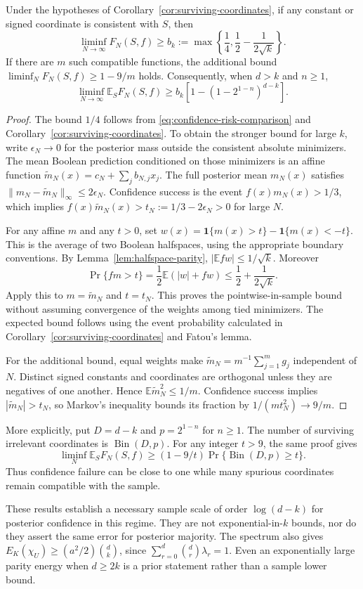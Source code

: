 \begin{corollary}
\label{cor:confidence-groundstates}
Under the hypotheses of Corollary~\ref{cor:surviving-coordinates},
if any constant or signed coordinate is consistent with $S$, then
\[
 \liminf_{N\to\infty}F_N(S,f)
 \ge b_k:=\max\left\{\frac14,\frac12-\frac1{2\sqrt{k}}\right\}.
\]
If there are $m$ such compatible functions, the additional bound
$\liminf_N F_N(S,f)\ge1-9/m$ holds.
Consequently, when $d>k$ and $n\ge1$,
\[
 \liminf_{N\to\infty}\mathbb E_S F_N(S,f)
 \ge b_k\left[1-\left(1-2^{1-n}\right)^{d-k}\right].
\]
\end{corollary}

\begin{proof}
The bound $1/4$ follows from
\eqref{eq:confidence-risk-comparison} and
Corollary~\ref{cor:surviving-coordinates}. To obtain the stronger
bound for large $k$, write $\epsilon_N\to0$ for the posterior mass
outside the consistent absolute minimizers. The mean Boolean
prediction conditioned on those minimizers is an affine function
$\widetilde m_N(x)=c_N+\sum_jb_{N,j}x_j$. The full posterior mean
$m_N(x)$ satisfies
$\|m_N-\widetilde m_N\|_\infty\le2\epsilon_N$.
Confidence success is the event $f(x)m_N(x)>1/3$, which implies
$f(x)\widetilde m_N(x)>t_N:=1/3-2\epsilon_N>0$ for large $N$.

For any affine $m$ and any $t>0$, set
$w(x)=\mathbf1\{m(x)>t\}-\mathbf1\{m(x)<-t\}$.
This is the average of two Boolean halfspaces, using the appropriate
boundary conventions. By Lemma~\ref{lem:halfspace-parity},
$|\mathbb E fw|\le1/\sqrt{k}$. Moreover
\[
 \Pr\{fm>t\}=\frac12\mathbb E(|w|+fw)
          \le\frac12+\frac1{2\sqrt{k}}.
\]
Apply this to $m=\widetilde m_N$ and $t=t_N$. This proves the
pointwise-in-sample bound without assuming convergence of the
weights among tied minimizers. The expected bound follows using
the event probability calculated in
Corollary~\ref{cor:surviving-coordinates} and Fatou's lemma.

For the additional bound, equal weights make
$\widetilde m_N=m^{-1}\sum_{j=1}^m g_j$ independent of $N$.
Distinct signed constants and coordinates are orthogonal unless
they are negatives of one another. Hence
$\mathbb E\widetilde m_N^2\le1/m$. Confidence success implies
$|\widetilde m_N|>t_N$, so Markov's inequality bounds its fraction
by $1/(mt_N^2)\to9/m$.
\end{proof}

More explicitly, put $D=d-k$ and $p=2^{1-n}$ for $n\ge1$.
The number of surviving irrelevant coordinates is
$\operatorname{Bin}(D,p)$. For any integer $t>9$, the same proof gives
\[
 \liminf_N\mathbb E_S F_N(S,f)
 \ge (1-9/t)\Pr\{\operatorname{Bin}(D,p)\ge t\}.
\]
Thus confidence failure can be close to one while many spurious
coordinates remain compatible with the sample.

These results establish a necessary sample scale of order
$\log(d-k)$ for posterior confidence in this regime. They are not
exponential-in-$k$ bounds, nor do they assert the same error for
posterior majority.
The spectrum also gives
$E_K(\chi_U)\ge(a^2/2)\binom dk$, since
$\sum_{r=0}^d\binom dr\lambda_r=1$. Even an exponentially large
parity energy when $d\ge2k$ is a prior statement rather than a
sample lower bound.
